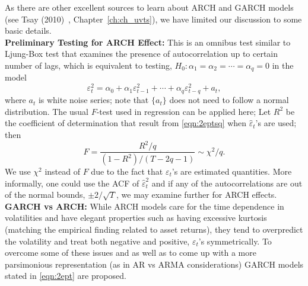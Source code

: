 As there are other excellent sources to learn about ARCH and GARCH models (see Tsay (2010)~\cite{tsay}, Chapter~\ref{ch:ch_uvts}), we have limited our discussion to some basic details. \\


\noindent\textbf{Preliminary Testing for ARCH Effect:} This is an omnibus test similar to Ljung-Box test that examines the presence of autocorrelation up to certain number of lags, which is equivalent to testing, $H_0: \alpha_1 = \alpha_2= \cdots = \alpha_q = 0$ in the model
	\begin{equation} \label{eqn:2eptsq}
	\varepsilon_t^2 = \alpha_0 + \alpha_1 \varepsilon_{t-1}^2 + \cdots + \alpha_q \varepsilon_{t-q}^2 + a_t,
	\end{equation}
where $a_t$ is white noise series; note that $\{ a_t \}$ does not need to follow a normal distribution. The usual $F$-test used in regression can be applied here; Let $R^2$ be the coefficient of determination that result from \eqref{eqn:2eptsq} when $\hat{\varepsilon}_t$'s are used; then
	\begin{equation} \label{eqn:2F}
	F = \frac{R^2/q}{(1 - R^2)/(T - 2q - 1)} \sim \chi^2/q.
	\end{equation}
We use $\chi^2$ instead of $F$ due to the fact that $\varepsilon_t$'s are estimated quantities. More informally, one could use the ACF of $\hat{\varepsilon}_t^2$ and if any of the autocorrelations are out of the normal bounds, $\pm 2/\sqrt{T}$, we may examine further for ARCH effects. \\


\noindent\textbf{GARCH vs ARCH:} While ARCH models care for the time dependence in volatilities and have elegant properties such as having excessive kurtosis (matching the empirical finding related to asset returns), they tend to overpredict the volatility and treat both negative and positive, $\varepsilon_t$'s symmetrically. To overcome some of these issues and as well as to come up with a more parsimonious representation (as in AR vs ARMA considerations) GARCH models stated in \eqref{eqn:2ept} are proposed. \\


